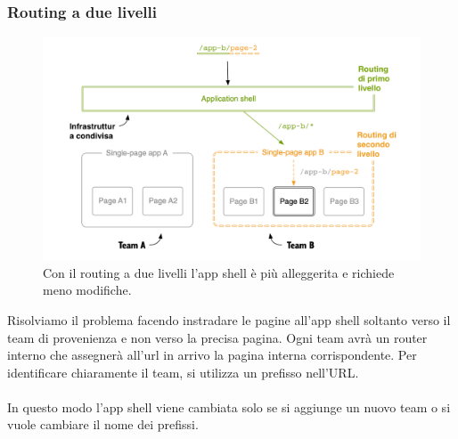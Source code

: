 \subsubsection{Routing a due livelli}
\begin{figure}[H]
    \centering
    \includegraphics[width=148mm]{img/routingduelivelli}
    \caption{Con il routing a due livelli l'app shell è più alleggerita e richiede meno modifiche.}
  \end{figure}
Risolviamo il problema facendo instradare le pagine all'app shell soltanto verso il team di provenienza 
e non verso la precisa pagina.
Ogni team avrà un router interno che assegnerà all'url in arrivo la pagina interna corrispondente.
Per identificare chiaramente il team, si utilizza un prefisso nell'URL.
\\\\
In questo modo l'app shell viene cambiata solo se si aggiunge un nuovo team o si vuole cambiare il nome dei prefissi.


\pagebreak
